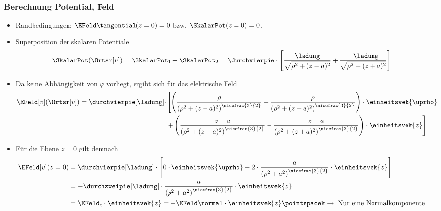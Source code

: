   \begin{frame}
    \frametitle{Berechnung Potential, Feld}

    \begin{itemize}[<+->]
\item  Randbedingungen: \(\EFeld\tangential(z=0) = 0\) bzw. \(\SkalarPot(z=0) = 0\). 

\item Superposition der skalaren Potentiale
  \begin{equation*}
	\SkalarPot(\Ortsr[v]) = \SkalarPot_1 + \SkalarPot_2
		= \durchvierpie \cdot \left[ \dfrac{\ladung}{\sqrt{\rho^2 + (z - a)^2}} + \dfrac{-\ladung}{\sqrt{\rho^2 + (z + a)^2}} \right]
\end{equation*}
\item Da keine Abhängigkeit von \(\varphi\) vorliegt, ergibt sich für das elektrische Feld
\begin{equation*}
	\begin{split}
		\EFeld[v](\Ortsr[v]) = \durchvierpie[\ladung] \cdot
                &\left[ \left( \dfrac{\rho}{\left( \rho^2 + (z - a)^2 \right)^{\nicefrac{3}{2}}} - \dfrac{\rho}{\left( \rho^2 + (z + a)^2 \right)^{\nicefrac{3}{2}}} \right) \cdot \einheitsvek{\uprho} \right. \\
		&	 \left. + \left( \dfrac{z - a}{\left( \rho^2 + (z - a)^2 \right)^{\nicefrac{3}{2}}} - \dfrac{z + a}{\left( \rho^2 + (z + a)^2 \right)^{\nicefrac{3}{2}}} \right) \cdot \einheitsvek{z} \right]
	\end{split}
\end{equation*}
\item Für die Ebene \(z = 0\) gilt demnach
\begin{align*}
	\EFeld[v](z=0) &= \durchvierpie[\ladung] \cdot \left[ 0 \cdot \einheitsvek{\uprho} - 2 \cdot \dfrac{a}{\left( \rho^2 + a^2 \right)^{\nicefrac{3}{2}}} \cdot \einheitsvek{z} \right] \\
		&= -\durchzweipie[\ladung] \cdot \dfrac{a}{\left( \rho^2 + a^2 \right)^{\nicefrac{3}{2}}} \cdot \einheitsvek{z} \\
		&= \EFeld_z \cdot \einheitsvek{z} = -\EFeld\normal \cdot \einheitsvek{z} \pointspacek \to \text{ Nur eine Normalkomponente}
\end{align*}
\end{itemize}
\end{frame}

